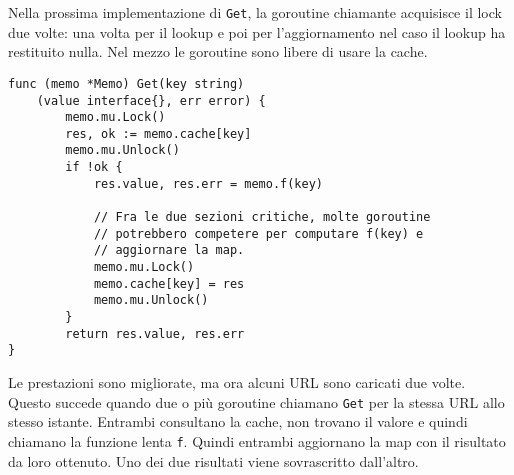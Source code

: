 Nella prossima implementazione di \verb|Get|, la goroutine chiamante acquisisce il lock due volte: una volta per il lookup e poi per l'aggiornamento nel caso il lookup ha restituito nulla.
Nel mezzo le goroutine sono libere di usare la cache.
\begin{lstlisting}[frame=single, label={lst:lstlisting9-7.7}]
func (memo *Memo) Get(key string)
    (value interface{}, err error) {
        memo.mu.Lock()
        res, ok := memo.cache[key]
        memo.mu.Unlock()
        if !ok {
            res.value, res.err = memo.f(key)

            // Fra le due sezioni critiche, molte goroutine
            // potrebbero competere per computare f(key) e
            // aggiornare la map.
            memo.mu.Lock()
            memo.cache[key] = res
            memo.mu.Unlock()
        }
        return res.value, res.err
}
\end{lstlisting}
Le prestazioni sono migliorate, ma ora alcuni URL sono caricati due volte.
Questo succede quando due o più goroutine chiamano \verb|Get| per la stessa URL allo stesso istante.
Entrambi consultano la cache, non trovano il valore e quindi chiamano la funzione lenta \verb|f|.
Quindi entrambi aggiornano la map con il risultato da loro ottenuto.
Uno dei due risultati viene sovrascritto dall'altro.


